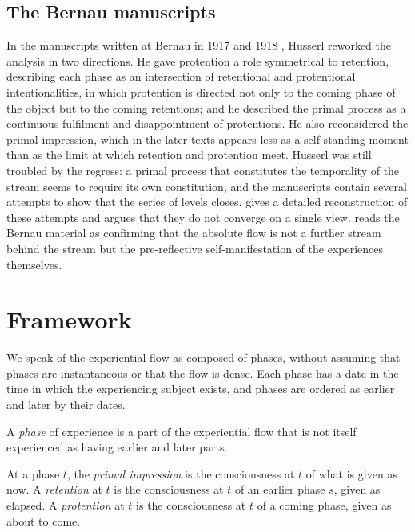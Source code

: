 \documentclass{situationist-preprint}
\begin{document}
\subsection{The Bernau manuscripts}

In the manuscripts written at Bernau in 1917 and 1918 \citep{Husserl2001}, Husserl reworked the analysis in two directions. He gave protention a role symmetrical to retention, describing each phase as an intersection of retentional and protentional intentionalities, in which protention is directed not only to the coming phase of the object but to the coming retentions; and he described the primal process as a continuous fulfilment and disappointment of protentions. He also reconsidered the primal impression, which in the later texts appears less as a self-standing moment than as the limit at which retention and protention meet. Husserl was still troubled by the regress: a primal process that constitutes the temporality of the stream seems to require its own constitution, and the manuscripts contain several attempts to show that the series of levels closes. \citet{Kortooms2002} gives a detailed reconstruction of these attempts and argues that they do not converge on a single view. \citet{Zahavi2004} reads the Bernau material as confirming that the absolute flow is not a further stream behind the stream but the pre-reflective self-manifestation of the experiences themselves.

\section{Framework}\label{s:framework}

We speak of the experiential flow as composed of phases, without assuming that phases are instantaneous or that the flow is dense. Each phase has a date in the time in which the experiencing subject exists, and phases are ordered as earlier and later by their dates.

\begin{definition}[Phase]\label{d:phase}
A \emph{phase} of experience is a part of the experiential flow that is not itself experienced as having earlier and later parts.
\end{definition}

\begin{definition}\label{d:moments}
At a phase $t$, the \emph{primal impression} is the consciousness at $t$ of what is given as now. A \emph{retention} at $t$ is the consciousness at $t$ of an earlier phase $s$, given as elapsed. A \emph{protention} at $t$ is the consciousness at $t$ of a coming phase, given as about to come.
\end{definition}
\end{document}
